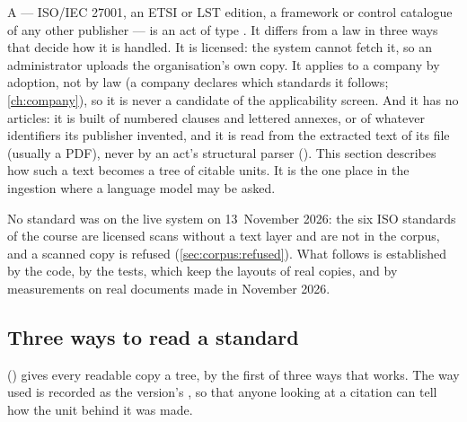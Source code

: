 A  --- ISO/IEC 27001, an ETSI or LST edition, a framework or control catalogue
of any other publisher --- is an act of type . It differs from a law in three
ways that decide how it is handled. It is licensed: the system cannot fetch it, so an
administrator uploads the organisation's own copy. It applies to a company by adoption, not
by law (a company declares which standards it follows; \cref{ch:company}), so it is never a
candidate of the applicability screen. And it has no articles: it is built of numbered
clauses and lettered annexes, or of whatever identifiers its publisher invented, and it is
read from the extracted text of its file (usually a PDF), never by an act's structural parser
(). This section describes how such a text
becomes a tree of citable units. It is the one place in the ingestion where a language model
may be asked.

No standard was on the live system on 13~November 2026: the six ISO standards of the course
are licensed scans without a text layer and are not in the corpus, and a scanned copy is
refused (\cref{sec:corpus:refused}). What follows is established by the code, by the tests,
which keep the layouts of real copies, and by measurements on real documents made in
November 2026.

\subsection{Three ways to read a standard}\label{sec:corpus:ways}

 () gives every readable copy a tree, by the
first of three ways that works. The way used is recorded as the version's , so
that anyone looking at a citation can tell how the unit behind it was made.

